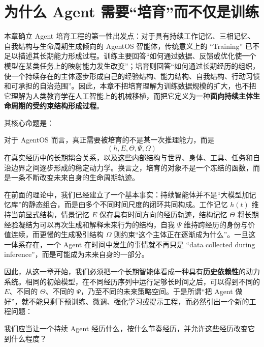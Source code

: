 \chapter{为什么 Agent 需要“培育”而不仅是训练}
\label{chap:agent-cultivation-vs-training}

\begin{chapterlead}
本章确立 Agent 培育工程的第一性出发点：对于具有持续工作记忆、三相记忆、自我结构与生命周期生成倾向的 AgentOS 智能体，传统意义上的 ``Training'' 已不足以描述其长期能力形成过程。训练主要回答“如何通过数据、反馈或优化使一个模型在某类任务上的映射能力发生改变”；培育则回答“如何通过长期经历的组织，使一个持续存在的主体逐步形成自己的经验结构、能力结构、自我结构、行动习惯和可承担的自治范围”。因此，本章不把培育理解为训练数据规模的扩大，也不把它理解为人类教育学在人工智能上的机械移植，而把它定义为一种\textbf{面向持续主体生命周期的受约束结构形成过程}。

其核心命题是：
\begin{statementbox}
\centering
{}
\end{statementbox}

对于 AgentOS 而言，真正需要被培育的不是某一次推理能力，而是
\[
\boxed{
(h,E,\Theta,\Psi,\Omega)
}
\]
在真实经历中的长期耦合关系，以及这些内部结构与世界、身体、工具、任务和自治边界之间逐步形成的稳定动力学。换言之，培育的对象不是一个冻结的函数，而是一条不断改变未来自身的生命周期轨迹。
\end{chapterlead}


在前面的理论中，我们已经建立了一个基本事实：持续智能体并不是“大模型加记忆库”的静态组合，而是由多个不同时间尺度的闭环共同构成。工作记忆 $h(t)$ 维持当前显式结构，情景记忆 $E$ 保存具有时间方向的经历轨迹，结构记忆 $\Theta$ 将长期经验凝结为可以再次生成和解释未来行为的结构，自我 $\Psi$ 维持跨经历的身份与价值连续，而更慢的生成吸引结构 $\Omega$ 则约束“这个主体正在逐渐成为什么”。一旦这一体系存在，一个 Agent 在时间中发生的事情就不再只是 ``data collected during inference''，而是可能成为未来自身的一部分。

因此，从这一章开始，我们必须把一个长期智能体看成一种具有\textbf{历史依赖性}的动力系统。相同的初始模型，在不同经历序列中运行足够长时间之后，可以得到不同的 $E$、不同的 $\Theta$、不同的 $\Psi$，乃至不同的未来策略空间。于是所谓“把 Agent 做好”，就不能只剩下预训练、微调、强化学习或提示工程，而必然引出一个新的工程问题：

\begin{statementbox}
我们应当让一个持续 Agent 经历什么，按什么节奏经历，并允许这些经历改变它到什么程度？
\end{statementbox}

